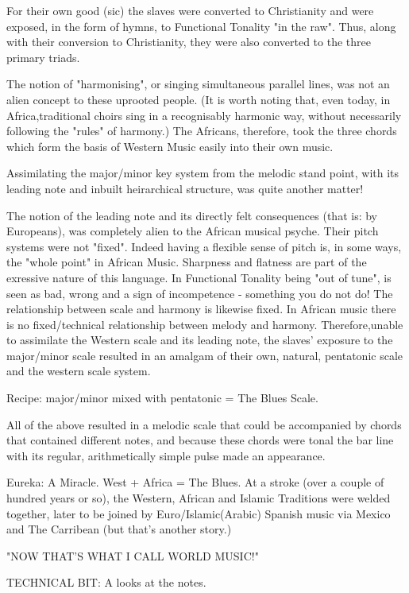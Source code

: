 \documentclass{article}
\begin{document}
For their own good (sic) the slaves were converted to Christianity and were exposed, in the form of hymns, to Functional Tonality "in the raw".
Thus, along with their conversion to Christianity, they were also converted to the three primary triads.

The notion of "harmonising", or singing simultaneous parallel lines, was not an alien concept to these uprooted people.
(It is worth noting that, even today, in Africa,traditional choirs sing in a recognisably harmonic way, without necessarily following the "rules" of harmony.)
The Africans, therefore, took the three chords which form the basis of Western Music easily into their own music.

Assimilating the major/minor key system from the melodic stand point, with its leading note and inbuilt heirarchical structure, was quite another matter!

The notion of the leading note and its directly felt consequences (that is: by Europeans), was completely alien to the African musical psyche.
Their pitch systems were not "fixed".
Indeed having a flexible sense of pitch is, in some ways,  the "whole point" in African Music.
Sharpness and flatness are part of the exressive nature of this language.
In Functional Tonality being "out of tune", is seen as bad, wrong and a sign of incompetence - something you do not do!
The relationship between scale and harmony is likewise fixed.
In African music there is no fixed/technical relationship between melody and harmony.
Therefore,unable to assimilate the Western scale and its leading note, the slaves' exposure to the major/minor scale resulted in an amalgam of their own, natural, pentatonic scale and the western scale system.

Recipe: major/minor mixed with pentatonic = The Blues Scale.

All of the above resulted in a  melodic scale that could be accompanied by chords that contained different notes, and because these chords were tonal the bar line with its regular, arithmetically simple pulse made an appearance.

Eureka: A Miracle.
West + Africa = The Blues.
At a stroke (over a couple of hundred years or so), the Western, African and Islamic Traditions were welded together, later to be joined by Euro/Islamic(Arabic) Spanish music via Mexico and The Carribean (but that's another story.)

"NOW THAT'S WHAT I CALL WORLD MUSIC!"

TECHNICAL BIT: A looks at the notes.
\end{document}
